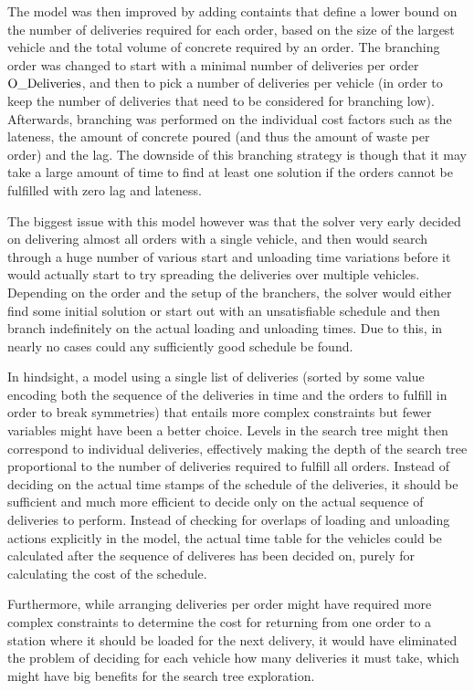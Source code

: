 \documentclass[a4paper]{article}
\begin{document}
The model was then improved by adding containts that define a lower bound on the number of deliveries required for each
order, based on the size of the largest vehicle and the total volume of concrete required by an order. The branching
order was changed to start with a minimal number of deliveries per order $\text{O\_Deliveries}$, and then to pick a number of
deliveries per vehicle (in order to keep the number of deliveries that need to be considered for branching low).
Afterwards, branching was performed on the individual cost factors such as the lateness, the amount of concrete poured (and thus the amount
of waste per order) and the lag. The downside of this branching strategy is though that it may take a large amount of
time to find at least one solution if the orders cannot be fulfilled with zero lag and lateness.

The biggest issue with this model however was that the solver very early decided on
delivering almost all orders with a single vehicle, and then would search through a huge number of various start and
unloading time variations before it would actually start to try spreading the deliveries over multiple vehicles.
Depending on the order and the setup of the branchers, the solver would either find some initial solution or start out
with an unsatisfiable schedule and then branch indefinitely on the actual loading and unloading times.
Due to this, in nearly no cases could any sufficiently good schedule be found. 

\medskip
In hindsight, a model using a single list of deliveries (sorted by some value encoding
both the sequence of the deliveries in time and the orders to fulfill in order to break symmetries) that entails more complex constraints but fewer variables might have
been a better choice. Levels in the search tree might then correspond to individual deliveries, effectively making the depth of
the search tree proportional to the number of deliveries required to fulfill all orders. Instead of deciding on the actual
time stamps of the schedule of the deliveries, it should be sufficient and much more efficient to decide only on the actual
sequence of deliveries to perform. Instead of checking for overlaps of loading and unloading actions explicitly in the
model, the actual time table for the vehicles could be calculated after the sequence of deliveres has been decided on,
purely for calculating the cost of the schedule.

Furthermore, while arranging deliveries per order might have required more complex constraints to
determine the cost for returning from one order to a station where it should be loaded for the next delivery, it would
have eliminated the problem of deciding for each vehicle how many deliveries it must take, which might have big
benefits for the search tree exploration.
\end{document}
